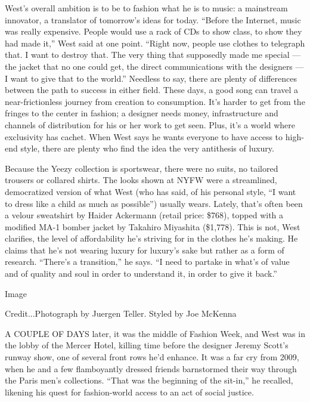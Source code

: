 West's overall ambition is to be to fashion what he is to music: a
mainstream innovator, a translator of tomorrow's ideas for today.
``Before the Internet, music was really expensive. People would use a
rack of CDs to show class, to show they had made it,'' West said at one
point. ``Right now, people use clothes to telegraph that. I want to
destroy that. The very thing that supposedly made me special --- the
jacket that no one could get, the direct communications with the
designers --- I want to give that to the world.'' Needless to say, there
are plenty of differences between the path to success in either field.
These days, a good song can travel a near-frictionless journey from
creation to consumption. It's harder to get from the fringes to the
center in fashion; a designer needs money, infrastructure and channels
of distribution for his or her work to get seen. Plus, it's a world
where exclusivity has cachet. When West says he wants everyone to have
access to high-end style, there are plenty who find the idea the very
antithesis of luxury.

Because the Yeezy collection is sportswear, there were no suits, no
tailored trousers or collared shirts. The looks shown at NYFW were a
streamlined, democratized version of what West (who has said, of his
personal style, ``I want to dress like a child as much as possible'')
usually wears. Lately, that's often been a velour sweatshirt by Haider
Ackermann (retail price: \$768), topped with a modified MA-1 bomber
jacket by Takahiro Miyashita (\$1,778). This is not, West clarifies, the
level of affordability he's striving for in the clothes he's making. He
claims that he's not wearing luxury for luxury's sake but rather as a
form of research. ``There's a transition,'' he says. ``I need to partake
in what's of value and of quality and soul in order to understand it, in
order to give it back.''

Image

Credit...Photograph by Juergen Teller. Styled by Joe McKenna

A COUPLE OF DAYS later, it was the middle of Fashion Week, and West was
in the lobby of the Mercer Hotel, killing time before the designer
Jeremy Scott's runway show, one of several front rows he'd enhance. It
was a far cry from 2009, when he and a few flamboyantly dressed friends
barnstormed their way through the Paris men's collections. ``That was
the beginning of the sit-in,'' he recalled, likening his quest for
fashion-world access to an act of social justice.

